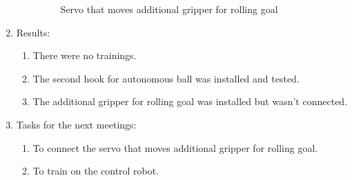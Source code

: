 \begin{enumerate}
\begin{enumerate}
\begin{figure}[H]
\begin{minipage}[h]{0.47\linewidth}
	  	  \end{minipage}
	  	  \caption{Servo that moves additional gripper for rolling goal}
	   \end{figure}

	\end{enumerate}
	
	\item Results:
	\begin{enumerate}
		
		\item There were no trainings.
		
		\item The second hook for autonomous ball was installed and tested.
		
        \item The additional gripper for rolling goal was installed but wasn't connected.
		
	\end{enumerate}
	
	\item Tasks for the next meetings:
	\begin{enumerate}
		
		\item To connect the servo that moves additional gripper for rolling goal.
		
		\item To train on the control robot.
			
	\end{enumerate}
\end{enumerate}
\fillpage
